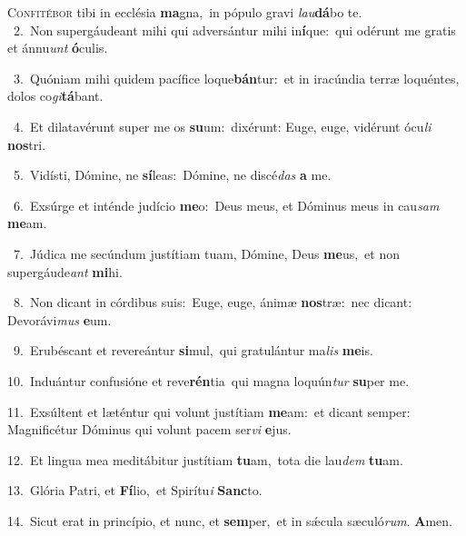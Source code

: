 \lettrine{\initial\textcolor{\initialcolor}{C}}{onfitébor} tibi in ecclésia \textbf{ma}\-gna,~\star in pópulo gravi \textit{lau}\-\textbf{dá}bo te.\\
{\numbfont\textcolor{\numbcolor}{~2.}}~Non supergáudeant mihi qui adversántur mihi in\-\textbf{í}\-que:~\star qui odérunt me gratis et ánnu\textit{unt} \textbf{ó}\-culis.\par
{\numbfont\textcolor{\numbcolor}{~3.}}~Quóniam mihi quidem pacífice loque\-\textbf{bán}\-tur:~\star et in iracúndia terræ loquéntes, dolos co\-\textit{gi}\-\textbf{tá}bant.\par
{\numbfont\textcolor{\numbcolor}{~4.}}~Et dilatavérunt super me os \textbf{su}\-um:~\star dixérunt: Euge, euge, vidérunt ócu\textit{li} \textbf{nos}\-tri.\par
{\numbfont\textcolor{\numbcolor}{~5.}}~Vidísti, Dómine, ne \textbf{sí}\-leas:~\star Dómine, ne discé\textit{das} \textbf{a} me.\par
{\numbfont\textcolor{\numbcolor}{~6.}}~Exsúrge et inténde judício \textbf{me}\-o:~\star Deus meus, et Dóminus meus in cau\textit{sam} \textbf{me}\-am.\par
{\numbfont\textcolor{\numbcolor}{~7.}}~Júdica me secúndum justítiam tuam, Dómine, Deus \textbf{me}\-us,~\star et non supergáude\textit{ant} \textbf{mi}\-hi.\par
{\numbfont\textcolor{\numbcolor}{~8.}}~Non dicant in córdibus suis:~\dagger Euge, euge, ánimæ \textbf{nos}\-træ:~\star nec dicant: Devorávi\textit{mus} \textbf{e}\-um.\par
{\numbfont\textcolor{\numbcolor}{~9.}}~Erubéscant et revereántur \textbf{si}\-mul,~\star qui gratulántur ma\textit{lis} \textbf{me}\-is.\par
{\numbfont\textcolor{\numbcolor}{10.}}~Induántur confusióne et reve\-\textbf{rén}\-tia~\star qui magna loquún\textit{tur} \textbf{su}\-per me.\par
{\numbfont\textcolor{\numbcolor}{11.}}~Exsúltent et læténtur qui volunt justítiam \textbf{me}\-am:~\star et dicant semper: Magnificétur Dóminus qui volunt pacem ser\textit{vi} \textbf{e}\-jus.\par
{\numbfont\textcolor{\numbcolor}{12.}}~Et lingua mea meditábitur justítiam \textbf{tu}\-am,~\star tota die lau\textit{dem} \textbf{tu}\-am.\par
{\numbfont\textcolor{\numbcolor}{13.}}~Glória Patri, et \textbf{Fí}\-lio,~\star et Spirítu\textit{i} \textbf{Sanc}\-to.\par
{\numbfont\textcolor{\numbcolor}{14.}}~Sicut erat in princípio, et nunc, et \textbf{sem}\-per,~\star et in sǽcula sæculó\-\textit{rum}\-. \textbf{A}\-men.\par
